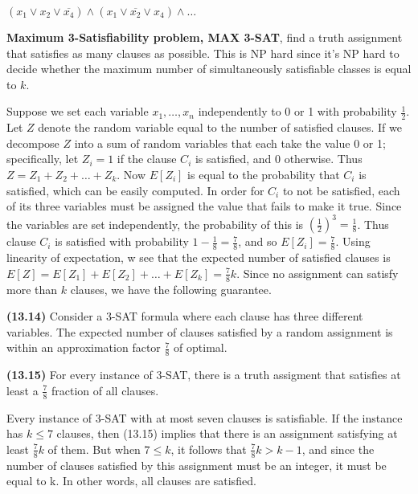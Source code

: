 \documentclass{proc}
\begin{document}
\begin{mdframed}
    $(x_1 \lor x_2 \lor \overline{x_4}) \land (x_1 \lor \overline{x_2} \lor x_4) \land \ldots$
\end{mdframed}


\textbf{Maximum 3-Satisfiability problem, MAX 3-SAT}, find a truth assignment that satisfies as many clauses as possible. This is NP hard since it's NP hard to decide whether the maximum number of simultaneously satisfiable classes is equal to $k$.

Suppose we set each variable $x_1, \ldots, x_n$ independently to 0 or 1 with probability $\frac{1}{2}$. Let $Z$ denote the random variable equal to the number of satisfied clauses. If we decompose $Z$ into a sum of random variables that each take the value 0 or 1; specifically, let $Z_i = 1$ if the clause $C_i$ is satisfied, and 0 otherwise. Thus $Z = Z_1 + Z_2 + \ldots + Z_k$. Now $E[Z_i]$ is equal to the probability that $C_i$ is satisfied, which can be easily computed. In order for $C_i$ to not be satisfied, each of its three variables must be assigned the value that fails to make it true. Since the variables are set independently, the probability of this is $(\frac{1}{2})^3 = \frac{1}{8}$. Thus clause $C_i$ is satisfied with probability $ 1 - \frac{1}{8} = \frac{7}{8}$, and so $E[Z_i] = \frac{7}{8}$. Using linearity of expectation, w see that the expected number of satisfied clauses is $E[Z] = E[Z_1] + E[Z_2] + \ldots + E[Z_k] = \frac{7}{8}k$. Since no assignment can satisfy more than $k$ clauses, we have the following guarantee.

\begin{mdframed}
    \textbf{(13.14)} Consider a 3-SAT formula where each clause has three different variables. The expected number of clauses satisfied by a random assignment is within an approximation factor $\frac{7}{8}$ of optimal.
\end{mdframed}

\begin{mdframed}
    \textbf{(13.15)} For every instance of 3-SAT, there is a truth assigment that satisfies at least a $\frac{7}{8}$ fraction of all clauses.
\end{mdframed}

Every instance of 3-SAT with at most seven clauses is satisfiable. If the instance has $k \le 7$ clauses, then (13.15) implies that there is an assignment satisfying at least $\frac{7}{8}k$ of them. But when $7 \le k$, it follows that $\frac{7}{8}k > k - 1$, and since the number of clauses satisfied by this assignment must be an integer, it must be equal to k. In other words, all clauses are satisfied.
\end{document}
